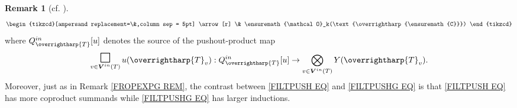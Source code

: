 \documentclass[a4paper,10pt
,draft
]{article}%
\numberwithin{equation}{section}
\numberwithin{figure}{section}
\theoremstyle{definition} %
\newtheorem{remark}[equation]{Remark}%
\newcommand{\vect}[1]{\text{\overrightharp{\ensuremath{#1}}}}
\renewcommand{\O}{\ensuremath{\mathcal O}}
\newcommand{\1}{\ensuremath{\mathbbm 1}}%
\begin{document}
\begin{remark}[{cf. \cite[Prop. 5.66]{BP_geo}}]
\begin{align}
\begin{tikzcd}[ampersand replacement=\&,column sep = 5pt]
	\arrow[r]
	\&
	\O_k(\vect{C})
	\end{tikzcd}
	\end{align}
	where $Q^{in}_{\vect{T}}[u]$ denotes the source of the pushout-product map
	\begin{equation}
	\mathop{\mathlarger{\mathlarger{\mathlarger{\square}}}}_{v \in \boldsymbol{V}^{in}(T)} u(\vect{T}_v): Q^{in}_{\vect{T}}[u] \to \bigotimes_{v \in \boldsymbol{V}^{in}(T)} Y(\vect{T}_v).
	\end{equation}
%	
	Moreover, just as in Remark \ref{FROPEXPG REM},
	the contrast between
	\eqref{FILTPUSH EQ} and \eqref{FILTPUSHG EQ}
	is that \eqref{FILTPUSH EQ} has more coproduct summands while 
	\eqref{FILTPUSHG EQ}
	has larger inductions.
\end{remark}
\end{document}
